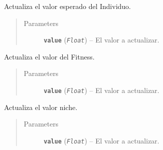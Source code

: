\documentclass[letterpaper,10pt,english]{sphinxmanual}
\begin{document}
\begin{fulllineitems}
\begin{fulllineitems}
\end{fulllineitems}


\begin{fulllineitems}
\label{Model/Community/Population/Individual/Individual:Model.Community.Population.Individual.Individual.Individual.set_expected_value}
Actualiza el valor esperado del Individuo.
\begin{quote}\begin{description}
\item[{Parameters}] \leavevmode
\textbf{\texttt{value}} (\emph{\texttt{Float}}) -- El valor a actualizar.

\end{description}\end{quote}

\end{fulllineitems}


\begin{fulllineitems}
\label{Model/Community/Population/Individual/Individual:Model.Community.Population.Individual.Individual.Individual.set_fitness}
Actualiza el valor del Fitness.
\begin{quote}\begin{description}
\item[{Parameters}] \leavevmode
\textbf{\texttt{value}} (\emph{\texttt{Float}}) -- El valor a actualizar.

\end{description}\end{quote}

\end{fulllineitems}


\begin{fulllineitems}
\label{Model/Community/Population/Individual/Individual:Model.Community.Population.Individual.Individual.Individual.set_niche_count}
Actualiza el valor niche.
\begin{quote}\begin{description}
\item[{Parameters}] \leavevmode
\textbf{\texttt{value}} (\emph{\texttt{Float}}) -- El valor a actualizar.


\end{description}
\end{quote}
\end{fulllineitems}
\end{fulllineitems}
\end{document}
